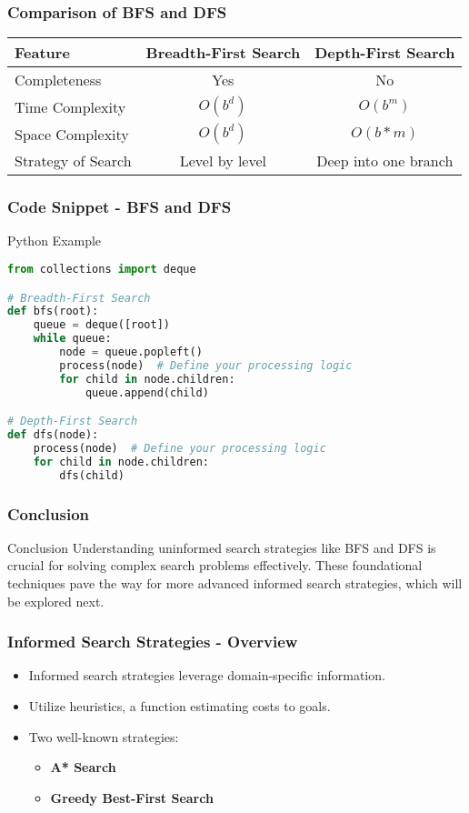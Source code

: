 \documentclass[aspectratio=169]{beamer}
\begin{document}
\begin{frame}[fragile]
    \frametitle{Comparison of BFS and DFS}
    \begin{tabular}{|l|c|c|}
        \hline
        Feature & Breadth-First Search & Depth-First Search \\
        \hline
        Completeness & Yes & No \\
        Time Complexity & $O(b^d)$ & $O(b^m)$ \\
        Space Complexity & $O(b^d)$ & $O(b*m)$ \\
        Strategy of Search & Level by level & Deep into one branch \\
        \hline
    \end{tabular}
\end{frame}

\begin{frame}[fragile]
    \frametitle{Code Snippet - BFS and DFS}
    \begin{block}{Python Example}
        \begin{lstlisting}[language=Python]
from collections import deque

# Breadth-First Search
def bfs(root):
    queue = deque([root])
    while queue:
        node = queue.popleft()
        process(node)  # Define your processing logic
        for child in node.children:
            queue.append(child)

# Depth-First Search
def dfs(node):
    process(node)  # Define your processing logic
    for child in node.children:
        dfs(child)
        \end{lstlisting}
    \end{block}
\end{frame}

\begin{frame}[fragile]
    \frametitle{Conclusion}
    \begin{block}{Conclusion}
        Understanding uninformed search strategies like BFS and DFS is crucial for solving complex search problems effectively. 
        These foundational techniques pave the way for more advanced informed search strategies, which will be explored next.
    \end{block}
\end{frame}

\begin{frame}[fragile]
    \frametitle{Informed Search Strategies - Overview}
    \begin{itemize}
        \item Informed search strategies leverage domain-specific information.
        \item Utilize heuristics, a function estimating costs to goals.
        \item Two well-known strategies:
        \begin{itemize}
            \item \textbf{A* Search}
            \item \textbf{Greedy Best-First Search}
        \end{itemize}
    \end{itemize}
\end{frame}
\end{document}
